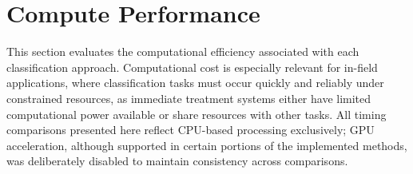 \documentclass[letterpaper, notitlepage]{report}
\begin{document}
%
%



\section{Compute Performance}
\label{section:performance}
This section evaluates the computational efficiency associated with each classification approach. Computational cost is especially relevant for in-field applications, where classification tasks must occur quickly and reliably under constrained resources, as immediate treatment systems either have limited computational power available or share resources with other tasks. All timing comparisons presented here reflect CPU-based processing exclusively; GPU acceleration, although supported in certain portions of the implemented methods, was deliberately disabled to maintain consistency across comparisons. 

{
\renewcommand{\arraystretch}{0.9}

}
\end{document}
